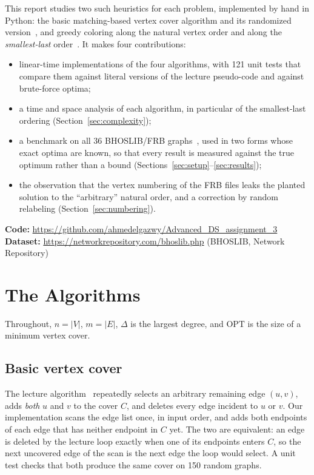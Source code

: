\documentclass[acmsmall,nonacm]{acmart}
\newcommand{\OPT}{\mathrm{OPT}}
\begin{document}
This report studies two such heuristics for each problem, implemented by hand
in Python: the basic matching-based vertex cover algorithm and its randomized
version~\cite{pitt1985}, and greedy coloring along the natural vertex order and
along the \emph{smallest-last} order~\cite{matula1983}. It makes four
contributions:
\begin{itemize}
  \item linear-time implementations of the four algorithms, with 121 unit tests that compare them against literal versions of the lecture pseudo-code and against brute-force optima;
  \item a time and space analysis of each algorithm, in particular of the smallest-last ordering (Section~\ref{sec:complexity});
  \item a benchmark on all 36 BHOSLIB/FRB graphs~\cite{xu2007,rossi2015}, used in two forms whose exact optima are known, so that every result is measured against the true optimum rather than a bound (Sections~\ref{sec:setup}--\ref{sec:results});
  \item the observation that the vertex numbering of the FRB files leaks the planted solution to the ``arbitrary'' natural order, and a correction by random relabeling (Section~\ref{sec:numbering}).
\end{itemize}

\noindent\textbf{Code:} \url{https://github.com/ahmedelgazwy/Advanced_DS_assignment_3}\\
\textbf{Dataset:} \url{https://networkrepository.com/bhoslib.php} (BHOSLIB, Network Repository)

\section{The Algorithms}
\label{sec:algorithms}

Throughout, $n=|V|$, $m=|E|$, $\Delta$ is the largest degree, and $\OPT$ is the
size of a minimum vertex cover.

\subsection{Basic vertex cover}

The lecture algorithm~\cite{cormen2009,skiena2020,salavatipour2013} repeatedly selects an arbitrary remaining edge $(u,v)$,
adds \emph{both} $u$ and $v$ to the cover $C$, and deletes every edge incident
to $u$ or $v$. Our implementation scans the edge list once, in input order,
and adds both endpoints of each edge that has neither endpoint in $C$ yet. The
two are equivalent: an edge is deleted by the lecture loop exactly when one of
its endpoints enters $C$, so the next uncovered edge of the scan is the next
edge the loop would select. A unit test checks that both produce the same cover
on 150 random graphs.
\end{document}
